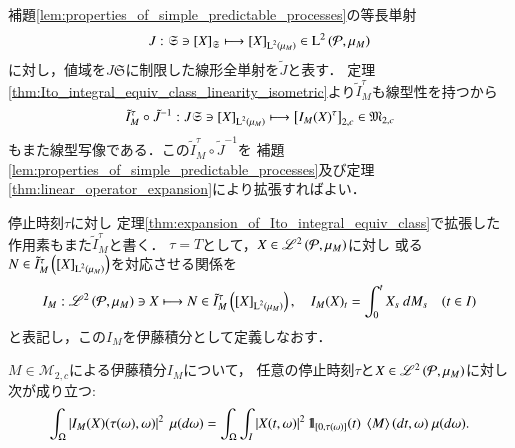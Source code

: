 	\begin{prf}
		補題\ref{lem:properties_of_simple_predictable_processes}の等長単射
		\begin{align}
			J:\mathfrak{S} \ni \left[X\right]_{\mathfrak{S}} \longmapsto \left[X\right]_{\operatorname{L}^{2} \left(\mu_M\right)} \in \operatorname{L}^{2} \left(\mathcal{P},\mu_M\right)
		\end{align}
		に対し，値域を$J\mathfrak{S}$に制限した線形全単射を$\tilde{J}$と表す．
		定理\ref{thm:Ito_integral_equiv_class_linearity_isometric}より$\tilde{I}^\tau_M$も線型性を持つから
		\begin{align}
			\tilde{I}^\tau_M \circ \tilde{J}^{-1}: J \mathfrak{S} \ni \left[X\right]_{\operatorname{L}^{2} \left(\mu_M\right)} \longmapsto \left[I_M(X)^\tau\right]_{2,c} \in \mathfrak{M}_{2,c}
		\end{align}
		もまた線型写像である．この$\tilde{I}^\tau_M \circ \tilde{J}^{-1}$を
		補題\ref{lem:properties_of_simple_predictable_processes}及び定理\ref{thm:linear_operator_expansion}により拡張すればよい．
		\QED
	\end{prf}
	
	\begin{screen}
		\begin{dfn}[伊藤積分の拡張]
			停止時刻$\tau$に対し
			定理\ref{thm:expansion_of_Ito_integral_equiv_class}で拡張した作用素もまた$\tilde{I}^\tau_M$と書く．
			$\tau = T$として，$X \in \mathscr{L}^{2} \left(\mathcal{P},\mu_M\right)$に対し
			或る$N \in \tilde{I}^\tau_M\left( \left[X\right]_{\operatorname{L}^{2} \left(\mu_M\right)} \right)$を対応させる関係を
			\begin{align}
				I_M: \mathscr{L}^{2} \left(\mathcal{P},\mu_M\right) \ni X \longmapsto N \in \tilde{I}^\tau_M\left( \left[X\right]_{\operatorname{L}^{2} \left(\mu_M\right)} \right), \quad
				I_M(X)_t = \int_0^t X_s\ d M_s \quad (t \in I)
			\end{align}
			と表記し，この$I_M$を伊藤積分として定義しなおす．
		\end{dfn}
	\end{screen}
	
	\begin{screen}
		\begin{lem}[停止時刻で停めた伊藤積分]
			$M \in \mathcal{M}_{2,c}$による伊藤積分$I_M$について，
			任意の停止時刻$\tau$と$X \in \mathscr{L}^{2} \left(\mathcal{P},\mu_M\right)$に対し次が成り立つ:
			\begin{align}
				\int_\Omega \left| I_M(X)(\tau(\omega),\omega) \right|^2\ \mu(d\omega)
				= \int_\Omega \int_I \left| X(t,\omega) \right|^2 \defunc_{[0,\tau(\omega)]}(t)\ \inprod<M>(dt,\omega)\ \mu(d\omega).
			\end{align}
			\label{thm:stopped_Ito_integral}
		\end{lem}
	\end{screen}
	
